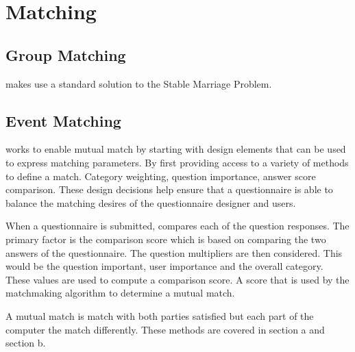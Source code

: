 \section{Matching}
\label{sec:matching}

\subsection{Group Matching}
\label{sec:groupmatch}
\Friending{} makes use a standard solution to the Stable Marriage Problem.

\subsection{Event Matching}
\label{sec:eventmatch}
\Friending{} works to enable mutual match by starting with design elements that can be used to express matching parameters. By first providing access to a variety of methods to define a match. Category weighting, question importance, answer score comparison. These design decisions help ensure that a questionnaire is able to balance the matching desires of the questionnaire designer and users.

When a questionnaire is submitted, \Friending{} compares each of the question responses. The primary factor is the comparison score which is based on comparing the two answers of the questionnaire. The question multipliers are then considered. This would be the question important, user importance and the overall category. These values are used to compute a comparison score. A score that is used by the matchmaking algorithm to determine a mutual match.

A mutual match is match with both parties satisfied but each part of the computer the match differently. These methods are covered in section a and section b.